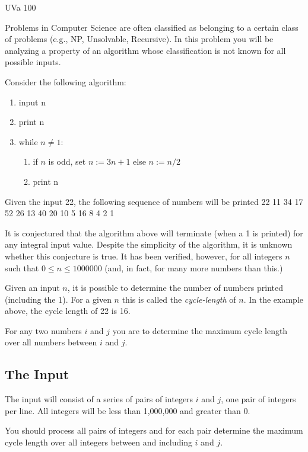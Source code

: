 
\noindent
UVa 100\bigskip

Problems in Computer Science are often classified as belonging to a
certain class of problems (e.g., NP, Unsolvable, Recursive).  In this
problem you will be analyzing a property of an algorithm whose
classification is not known for all possible inputs.

Consider the following algorithm:
\begin{enumerate}
    \item input n
    \item print n
    \item while $n\neq 1$:
    \begin{enumerate}
        \item if $n$ is odd, set $n:=3n+1$ else $n:=n/2$
        \item print n
    \end{enumerate}
\end{enumerate}

Given the input 22, the following sequence of numbers will be printed
22 11 34 17 52 26 13 40 20 10 5 16 8 4 2 1

It is conjectured that the algorithm above will terminate (when a 1 is
printed) for any integral
input value.  Despite the simplicity of the algorithm,
it is unknown whether this conjecture is true.  It has been verified,
however, for all integers $n$ such that $0\leq n\leq 1000000$  (and, in fact,
for many more numbers than this.)

Given an input $n$, it is possible to determine
the number of numbers printed (including
 the 1).  For a given $n$ this is
called the \emph{cycle-length} of $n$.  In the example above, the cycle
length of 22 is 16.

For any two numbers $i$ and $j$ you are to determine the maximum cycle
length over all numbers between $i$ and
$j$.



\subsection*{The Input}

The input will consist of a series of pairs of integers $i$ and $j$, one pair of
integers per line.  All integers will be less than 1,000,000 and greater
than 0.

You should process all pairs of integers and for each
pair determine the maximum cycle length over all integers between and
including $i$ and $j$.

